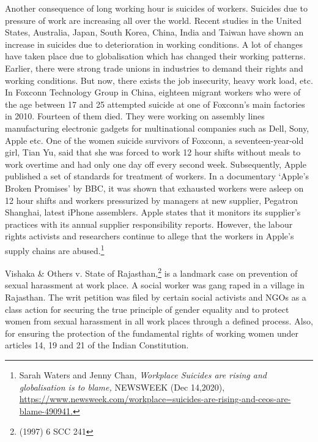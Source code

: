 \begin{multicols}{2}
\vspace{-.1cm}

\noi
Another consequence of long working hour is suicides of workers. Suicides due to pressure
of work are increasing all over the world. Recent studies in the United States, Australia,
Japan, South Korea, China, India and Taiwan have shown an increase in suicides due to
deterioration in working conditions. A lot of changes have taken place due to globalisation
which has changed their working patterns. Earlier, there were strong trade unions in
industries to demand their rights and working conditions. But now, there exists the job
insecurity, heavy work load, etc. In Foxconn Technology Group in China, eighteen migrant 
workers who were of the age between 17 and 25 attempted suicide at one of Foxconn’s main
factories in 2010. Fourteen of them died. They were working on assembly lines
manufacturing electronic gadgets for multinational companies such as Dell, Sony, Apple etc.
One of the women suicide survivors of Foxconn, a seventeen-year-old girl, Tian Yu, said that
she was forced to work 12 hour shifts without meals to work overtime and had only one day
off every second week. Subsequently, Apple published a set of standards for treatment of
workers. In a documentary ‘Apple’s Broken Promises’ by BBC, it was shown that exhausted
workers were asleep on 12 hour shifts and workers pressurized by managers at new supplier,
Pegatron Shanghai, latest iPhone assemblers. Apple states that it monitors its supplier’s
practices with its annual supplier responsibility reports. However, the labour rights activists
and researchers continue to allege that the workers in Apple’s supply chains are abused.\footnote{Sarah Waters and Jenny Chan, \textit{Workplace Suicides are rising and globalisation is to blame,} NEWSWEEK
(Dec 14,2020),\\ \url{https://www.newsweek.com/workplace=suicides-are-rising-and-ceos-are-blame-490941.}}


\vspace{-.15cm}



\vspace{-.15cm}

\noi
Vishaka \& Others v. State of Rajasthan,\footnote{(1997) 6 SCC 241} is a landmark case on prevention of sexual
harassment at work place. A social worker was gang raped in a village in Rajasthan. The writ
petition was filed by certain social activists and NGOs as a class action for securing the true
principle of gender equality and to protect women from sexual harassment in all work places
through a defined process. Also, for ensuring the protection of the fundamental rights of
working women under articles 14, 19 and 21 of the Indian Constitution.


\end{multicols}
